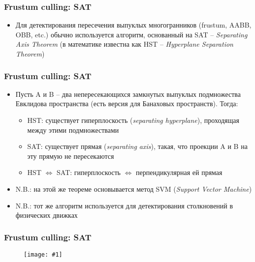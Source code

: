 \documentclass{beamer}
\newcommand{\slideimage}[1]{
  \begin{figure}
    \begin{adjustbox}{width=\textwidth, totalheight=\textheight-2\baselineskip-2\baselineskip,keepaspectratio}
      \texttt{[image: \#1]}
    \end{adjustbox}
  \end{figure}
}
\begin{document}
\begin{frame}[fragile]
\frametitle{Frustum culling: SAT}
\begin{itemize}
\item Для детектирования пересечения выпуклых многогранников (frustum, AABB, OBB, etc.) обычно используется алгоритм, основанный на SAT -- \textit{Separating Axis Theorem} (в математике известна как HST -- \textit{Hyperplane Separation Theorem})
\end{itemize}
\end{frame}

\begin{frame}[fragile]
\frametitle{Frustum culling: SAT}
\begin{itemize}
\item Пусть A и B -- два непересекающихся замкнутых выпуклых подмножества Евклидова пространства (есть версия для Банаховых пространств). Тогда:
\pause
\begin{itemize}
\item HST: существует гиперплоскость (\textit{separating hyperplane}), проходящая между этими подмножествами
\pause
\item SAT: существует прямая (\textit{separating axis}), такая, что проекции A и B на эту прямую не пересекаются
\pause
\item HST \begin{math}\Leftrightarrow\end{math} SAT: гиперплоскость \begin{math}\Leftrightarrow\end{math} перпендикулярная ей прямая
\end{itemize}
\pause
\item N.B.: на этой же теореме основывается метод SVM (\textit{Support Vector Machine})
\pause
\item N.B.: тот же алгоритм используется для детектирования столкновений в физических движках
\end{itemize}
\end{frame}

\begin{frame}[fragile]
\frametitle{Frustum culling: SAT}
\slideimage{sat.png}
\end{frame}
\end{document}

